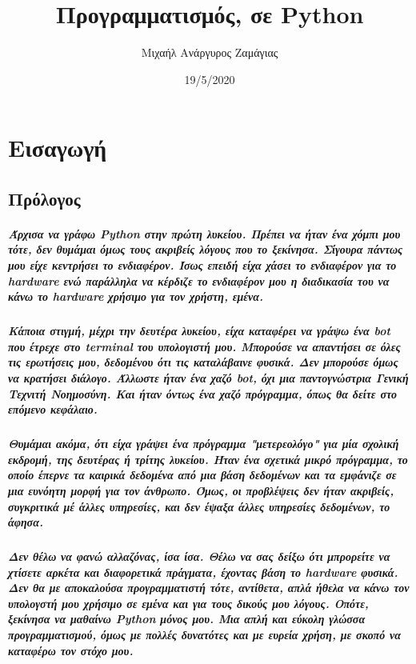 \documentclass[a4paper,10pt]{report}
\title{Προγραμματισμός, σε Python}
\author{Μιχαήλ Ανάργυρος Ζαμάγιας}
\date{19/5/2020}
\begin{document}
\maketitle

\tableofcontents

\chapter{Εισαγωγή}

\section{Πρόλογος}
\paragraph{
    Άρχισα να γράφω Python στην πρώτη λυκείου. Πρέπει να ήταν ένα χόμπι μου
    τότε, δεν θυμάμαι όμως τους ακριβείς λόγους που το ξεκίνησα. Σίγουρα
    πάντως μου είχε κεντρήσει το ενδιαφέρον. Ίσως επειδή είχα χάσει το
    ενδιαφέρον για το hardware ενώ παράλληλα να κέρδιζε το ενδιαφέρον
    μου η διαδικασία του να κάνω το hardware χρήσιμο για τον χρήστη, εμένα.
}
\paragraph{
    Κάποια στιγμή, μέχρι την δευτέρα λυκείου, είχα καταφέρει να γράψω ένα
    bot που έτρεχε στο terminal του υπολογιστή μου. Μπορούσε να απαντήσει σε
    όλες τις ερωτήσεις μου, δεδομένου ότι τις καταλάβαινε φυσικά. Δεν μπορούσε
    όμως να κρατήσει διάλογο. Άλλωστε ήταν ένα χαζό bot, όχι μια παντογνώστρια
    Γενική Τεχνιτή Νοημοσύνη. Και ήταν όντως ένα χαζό πρόγραμμα, όπως θα δείτε
    στο επόμενο κεφάλαιο.
}
\paragraph{
    Θυμάμαι ακόμα, ότι είχα γράψει ένα πρόγραμμα "μετερεολόγο" για μία σχολική
    εκδρομή, της δευτέρας ή τρίτης λυκείου. Ήταν ένα σχετικά μικρό πρόγραμμα,
    το οποίο έπερνε τα καιρικά δεδομένα από μια βάση δεδομένων και τα
    εμφάνιζε σε μια ευνόητη μορφή για τον άνθρωπο. Όμως, οι προβλέψεις δεν
    ήταν ακριβείς, συγκριτικά μέ άλλες υπηρεσίες, και δεν έψαξα άλλες
    υπηρεσίες δεδομένων, το άφησα.
}
\paragraph{
    Δεν θέλω να φανώ αλλαζόνας, ίσα ίσα. Θέλω να σας δείξω ότι μπρορείτε να
    χτίσετε αρκέτα και διαφορετικά πράγματα, έχοντας βάση το hardware φυσικά.
    Δεν θα με αποκαλούσα προγραμματιστή τότε, αντίθετα, απλά ήθελα να κάνω
    τον υπολογστή μου χρήσιμο σε εμένα και για τους δικούς μου λόγους. Οπότε,
    ξεκίνησα να μαθαίνω Python μόνος μου. Μια απλή και εύκολη γλώσσα
    προγραμματισμού, όμως με πολλές δυνατότες και με ευρεία χρήση, με σκοπό
    να καταφέρω τον στόχο μου.
}
\end{document}
